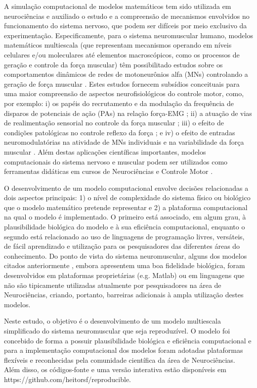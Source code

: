 A simulação computacional de modelos matemáticos tem sido utilizada em neurociências e auxiliado o estudo e a compreensão de mecanismos envolvidos no funcionamento do sistema nervoso, que podem ser difíceis por meio exclusivo da experimentação. Especificamente, para o sistema neuromuscular humano, modelos matemáticos multiescala (que representam mecanismos operando em níveis celulares e/ou moleculares até elementos macroscópicos, como os processos de geração e controle da força muscular) têm possibilitado estudos sobre os comportamentos dinâmicos de redes de motoneurônios alfa (MNs) controlando a geração de força muscular \cite{Fuglevand1993,Schuurmans2009,Stienen2007,Elias2012,Cisi2008a}. Estes estudos fornecem subsídios conceituais para uma maior compreensão de aspectos neurofisiológicos do controle motor, como, por exemplo: i) os papéis do recrutamento e da modulação da frequência de disparos de potenciais de ação (PAs) na relação força-EMG \cite{Fuglevand1993}; ii) a atuação de vias de realimentação sensorial no controle da força muscular \cite{Schuurmans2009}; iii) o efeito de condições patológicas no controle reflexo da força \cite{Stienen2007}; e iv) o efeito de entradas neuromodulatórias na atividade de MNs individuais e na variabilidade da força muscular \cite{Elias2012}. Além destas aplicações científicas importantes, modelos computacionais do sistema nervoso e muscular podem ser utilizados como ferramentas didáticas em cursos de Neurociências e Controle Motor \cite{Cisi2008a}.

O desenvolvimento de um modelo computacional envolve decisões relacionadas a dois aspectos principais: 1) o nível de complexidade do sistema físico ou biológico que o modelo matemático pretende representar e 2) a plataforma computacional na qual o modelo é implementado. O primeiro está associado, em algum grau, à plausibilidade biológica do modelo e à sua eficiência computacional, enquanto o segundo está relacionado ao uso de linguagens de programação livres, versáteis, de fácil aprendizado e utilização para os pesquisadores das diferentes áreas do conhecimento. Do ponto de vista do sistema neuromuscular, alguns dos modelos citados anteriormente \cite{Fuglevand1993,Schuurmans2009,Stienen2007,Elias2012,Cisi2008a}, embora apresentem uma boa fidelidade biológica, foram desenvolvidos em plataformas proprietárias (e.g. Matlab) ou em linguagens que não são tipicamente utilizadas atualmente por pesquisadores na área de Neurociências, criando, portanto, barreiras adicionais à ampla utilização destes modelos.

Neste estudo, o objetivo é o desenvolvimento de um modelo multiescala simplificado do sistema neuromuscular que seja reproduzível. O modelo foi concebido de forma a possuir plausibilidade biológica e eficiência computacional e para a implementação computacional dos modelos foram adotadas plataformas flexíveis e reconhecidas pela comunidade científica da área de Neurociências. Além disso, os códigos-fonte e uma versão interativa estão disponíveis em https://github.com/heitorsf/reproducible.
